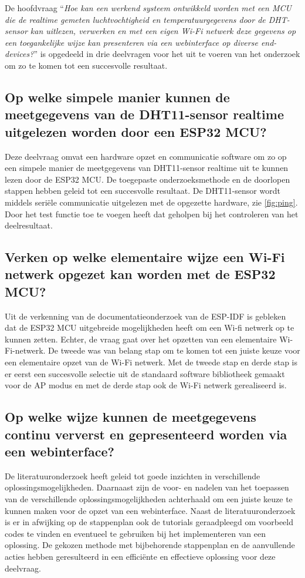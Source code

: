 De hoofdvraag ``\textit{Hoe kan een werkend systeem ontwikkeld worden met een MCU die de realtime gemeten luchtvochtigheid en temperatuurgegevens door de DHT-sensor 
kan uitlezen, verwerken en met een eigen Wi-Fi netwerk deze gegevens op een toegankelijke wijze kan presenteren via een webinterface op diverse end-devices?}'' 
is opgedeeld in drie deelvragen voor het uit te voeren van het onderzoek om zo te komen tot een succesvolle resultaat.  

\subsection{Op welke simpele manier kunnen de meetgegevens van de DHT11-sensor realtime uitgelezen worden door een ESP32 MCU?}
Deze deelvraag omvat een hardware opzet en communicatie software om zo op een simpele manier de meetgegevens van DHT11-sensor realtime uit te kunnen lezen door de ESP32 MCU.
De toegepaste onderzoeksmethode en de doorlopen stappen hebben geleid tot een succesvolle resultaat. De DHT11-sensor wordt middels seriële communicatie uitgelezen met de opgezette hardware, zie \autoref{fig:ping}.
Door het test functie toe te voegen heeft dat geholpen bij het controleren van het deelresultaat.

\subsection{Verken op welke elementaire wijze een Wi-Fi netwerk opgezet kan worden met de ESP32 MCU?}
Uit de verkenning van de documentatieonderzoek van de ESP-IDF is gebleken dat de ESP32 MCU uitgebreide mogelijkheden heeft om een Wi-fi netwerk op te kunnen zetten. Echter, 
de vraag gaat over het opzetten van een elementaire Wi-Fi-netwerk. De tweede was van belang stap om te komen tot een juiste keuze voor een elementaire opzet van de Wi-Fi netwerk. 
Met de tweede stap en derde stap is er eerst een succesvolle selectie uit de standaard software bibliotheek gemaakt voor de AP modus en met de derde stap ook de Wi-Fi netwerk gerealiseerd is.

\subsection{Op welke wijze kunnen de meetgegevens continu ververst en gepresenteerd worden via een webinterface?}
De literatuuronderzoek heeft geleid tot goede inzichten in verschillende oplossingsmogelijkheden. Daarnaast zijn de voor- en nadelen van het toepassen van de verschillende 
oplossingsmogelijkheden achterhaald om een juiste keuze te kunnen maken voor de opzet van een webinterface. 
Naast de literatuuronderzoek is er in afwijking op de stappenplan ook de tutorials geraadpleegd om voorbeeld codes te vinden en eventueel te gebruiken bij het implementeren van een oplossing.
De gekozen methode met bijbehorende stappenplan en de aanvullende acties hebben geresulteerd in een efficiënte en effectieve oplossing voor deze deelvraag. 

